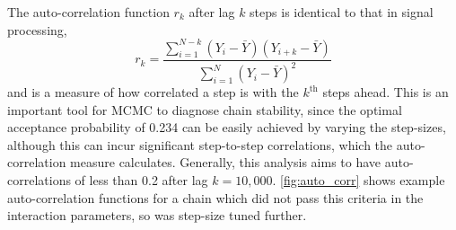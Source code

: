 The auto-correlation function $r_k$ after lag $k$ steps is identical to that in signal processing,
\begin{equation}
r_k = \frac{\sum_{i=1}^{N-k}\left(Y_i-\bar{Y}\right) \left(Y_{i+k} - \bar{Y}\right)} {\sum_{i=1}^N \left(Y_i-\bar{Y}\right)^2 }
\end{equation}
and is a measure of how correlated a step is with the $k^\text{th}$ steps ahead. This is an important tool for MCMC to diagnose chain stability, since the optimal acceptance probability of 0.234 can be easily achieved by varying the step-sizes, although this can incur significant step-to-step correlations, which the auto-correlation measure calculates. Generally, this analysis aims to have auto-correlations of less than 0.2 after lag $k=10,000$. \autoref{fig:auto_corr} shows example auto-correlation functions for a chain which did not pass this criteria in the interaction parameters, so was step-size tuned further.
